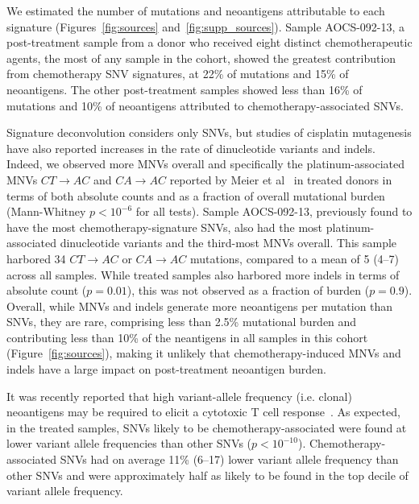 We estimated the number of mutations and neoantigens attributable to each signature (Figures~\ref{fig:sources} and~\ref{fig:supp_sources}). Sample AOCS-092-13, a post-treatment sample from a donor who received eight distinct chemotherapeutic agents, the most of any sample in the cohort, showed the greatest contribution from chemotherapy SNV signatures, at 22\% of mutations and 15\% of neoantigens. The other post-treatment samples showed less than 16\% of mutations and 10\% of neoantigens attributed to chemotherapy-associated SNVs.

Signature deconvolution considers only SNVs, but studies of cisplatin mutagenesis have also reported increases in the rate of dinucleotide variants and indels. Indeed, we observed more MNVs overall and specifically the platinum-associated MNVs $CT \rightarrow AC$ and $CA \rightarrow AC$ reported by Meier et al~\cite{Meier_2014} in treated donors in terms of both absolute counts and as a fraction of overall mutational burden (Mann-Whitney $p < 10^{-6}$ for all tests). Sample AOCS-092-13, previously found to have the most chemotherapy-signature SNVs, also had the most platinum-associated dinucleotide variants and the third-most MNVs overall. This sample harbored 34 $CT \rightarrow AC$ or $CA \rightarrow AC$ mutations, compared to a mean of 5 (4--7) across all samples. While treated samples also harbored more indels in terms of absolute count ($p=0.01$), this was not observed as a fraction of burden ($p=0.9$). Overall, while MNVs and indels generate more neoantigens per mutation than SNVs, they are rare, comprising less than 2.5\% mutational burden and contributing less than 10\% of the neantigens in all samples in this cohort (Figure~\ref{fig:sources}), making it unlikely that chemotherapy-induced MNVs and indels have a large impact on post-treatment neoantigen burden.

It was recently reported that high variant-allele frequency (i.e. clonal) neoantigens may be required to elicit a cytotoxic T cell response~\cite{McGranahan_2016}. As expected, in the treated samples, SNVs likely to be chemotherapy-associated were found at lower variant allele frequencies than other SNVs ($p < 10^{-10}$). Chemotherapy-associated SNVs had on average 11\% (6--17) lower variant allele frequency than other SNVs and were approximately half as likely to be found in the top decile of variant allele frequency.